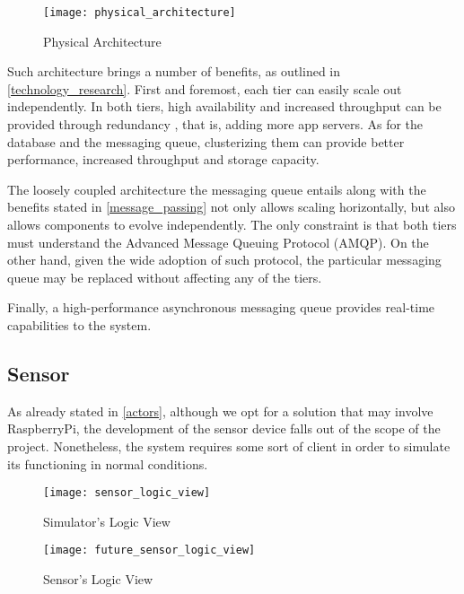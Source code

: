 \begin{figure}[H]
	\centering
	\texttt{[image: physical\_architecture]}
	\caption{Physical Architecture}
	\label{fig:physical_architecture}
\end{figure}

Such architecture brings a number of benefits, as outlined in \ref{technology_research}. First and foremost, each tier can easily scale out independently. In both tiers, high availability and increased throughput can be provided through redundancy \cite{Antwerp}, that is, adding more app servers. As for the database and the messaging queue, clusterizing them can provide better performance, increased throughput and storage capacity.

The loosely coupled architecture the messaging queue entails along with the benefits stated in \ref{message_passing} not only allows scaling horizontally, but also allows components to evolve independently. The only constraint is that both tiers must understand the Advanced Message Queuing Protocol (AMQP). On the other hand, given the wide adoption of such protocol, the particular messaging queue may be replaced without affecting any of the tiers.

Finally, a high-performance asynchronous messaging queue provides real-time capabilities to the system.

\subsection{Sensor}

As already stated in \ref{actors}, although we opt for a solution that may involve RaspberryPi, the development of the sensor device falls out of the scope of the project. Nonetheless, the system requires some sort of client in order to simulate its functioning in normal conditions.

\begin{figure}[H]
\begin{minipage}{.5\textwidth}
	\centering
	\texttt{[image: sensor\_logic\_view]}
	\caption{Simulator's Logic View}
	\label{fig:sensor_logic_view}
\end{minipage}
\begin{minipage}{.5\textwidth}
	\centering
	\texttt{[image: future\_sensor\_logic\_view]}
	\caption{Sensor's Logic View}
	\label{fig:future_sensor_logic_view}
\end{minipage}
\end{figure}

